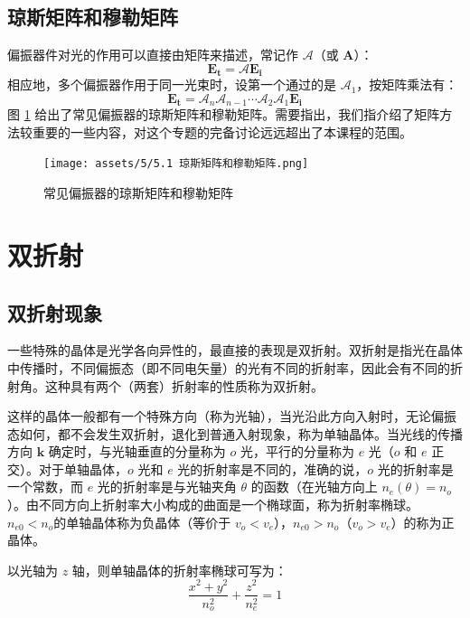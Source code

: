 \documentclass[UTF8]{report}
\theoremstyle{MyLineTheoremStyle} %
\theoremstyle{MyBlockTheoremStyle} %
\theoremstyle{MySubsubsectionStyle} %
\begin{document}
\subsection{琼斯矩阵和穆勒矩阵}
偏振器件对光的作用可以直接由矩阵来描述，常记作 $\mathscr{A}$（或 $\boldsymbol{A}$）： 
\begin{equation}
\boldsymbol{E_t} = \mathscr{A} \boldsymbol{E_i}
\end{equation}
相应地，多个偏振器作用于同一光束时，设第一个通过的是 $\mathscr{A_1}$，按矩阵乘法有：
\begin{equation}
    \boldsymbol{E_t} = \mathscr{A}_n\mathscr{A}_{n-1}\cdots\mathscr{A}_{2}\mathscr{A}_{1} \boldsymbol{E_i}
\end{equation}
图 \ref{琼斯矩阵} 给出了常见偏振器的琼斯矩阵和穆勒矩阵。需要指出，我们指介绍了矩阵方法较重要的一些内容，对这个专题的完备讨论远远超出了本课程的范围。
\begin{figure}[H]\centering
    \texttt{[image: assets/5/5.1 琼斯矩阵和穆勒矩阵.png]}
    \caption{常见偏振器的琼斯矩阵和穆勒矩阵}
    \label{琼斯矩阵}
\end{figure}

\section{双折射}

\subsection{双折射现象}
一些特殊的晶体是光学各向异性的，最直接的表现是双折射。双折射是指光在晶体中传播时，不同偏振态（即不同电矢量）的光有不同的折射率，因此会有不同的折射角。这种具有两个（两套）折射率的性质称为双折射。

这样的晶体一般都有一个特殊方向（称为光轴），当光沿此方向入射时，无论偏振态如何，都不会发生双折射，退化到普通入射现象，称为单轴晶体。当光线的传播方向 $\boldsymbol{k}$ 确定时，与光轴垂直的分量称为 $o$ 光，平行的分量称为 $e$ 光（$o$ 和 $e$ 正交）。对于单轴晶体，$o$ 光和 $e$ 光的折射率是不同的，准确的说，$o$ 光的折射率是一个常数，而 $e$ 光的折射率是与光轴夹角 $\theta$ 的函数（在光轴方向上 $n_e(\theta) = n_o$）。由不同方向上折射率大小构成的曲面是一个椭球面，称为折射率椭球。$n_{e0} < n_o$的单轴晶体称为负晶体（等价于 $v_o < v_e$），$n_{e0} > n_o$（$v_o > v_e$）的称为正晶体。

以光轴为 $z$ 轴，则单轴晶体的折射率椭球可写为：
\begin{equation}
\frac{x^2 + y^2}{n_o^2} + \frac{z^2}{n_e^2} = 1
\end{equation}
\end{document}
